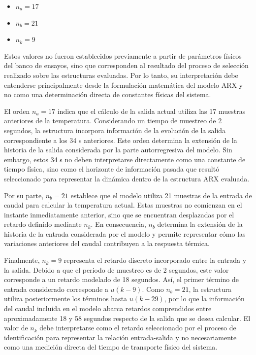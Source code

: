 \documentclass[11pt]{report}
\begin{document}
\begin{itemize}
    \item $n_{a}=17$
    \item $n_{b}=21$
    \item $n_{k}=9$ 
\end{itemize}

Estos valores no fueron establecidos previamente a partir de parámetros físicos del banco de ensayos, sino que corresponden al resultado del proceso de selección realizado sobre las estructuras evaluadas. Por lo tanto, su interpretación debe entenderse principalmente desde la formulación matemática del modelo ARX y no como una determinación directa de constantes físicas del sistema.


El orden $n_{a}=17$ indica que el cálculo de la salida actual utiliza las 17 muestras anteriores de la temperatura. Considerando un tiempo de muestreo de 2 segundos, la estructura incorpora información de la evolución de la salida correspondiente a los 34 s anteriores. Este orden determina la extensión de la historia de la salida considerada por la parte autorregresiva del modelo. Sin embargo, estos 34 s no deben interpretarse directamente como una constante de tiempo física, sino como el horizonte de información pasada que resultó seleccionado para representar la dinámica dentro de la estructura ARX evaluada.

Por su parte, $n_{b}=21$ establece que el modelo utiliza 21 muestras de la entrada de caudal para calcular la temperatura actual. Estas muestras no comienzan en el instante inmediatamente anterior, sino que se encuentran desplazadas por el retardo definido mediante $n_k$. En consecuencia, $n_b$ determina la extensión de la historia de la entrada considerada por el modelo y permite representar cómo las variaciones anteriores del caudal contribuyen a la respuesta térmica.

Finalmente, $n_k=9$ representa el retardo discreto incorporado entre la entrada y la salida. Debido a que el período de muestreo es de 2 segundos, este valor corresponde a un retardo modelado de 18 segundos. Así, el primer término de entrada considerado corresponde a $u(k-9)$. Como $n_b=21$, la estructura utiliza posteriormente los términos hasta $u(k-29)$, por lo que la información del caudal incluida en el modelo abarca retardos comprendidos entre aproximadamente 18 y 58 segundos respecto de la salida que se desea calcular. El valor de $n_k$ debe interpretarse como el retardo seleccionado por el proceso de identificación para representar la relación entrada-salida y no necesariamente como una medición directa del tiempo de transporte físico del sistema.
\end{document}
